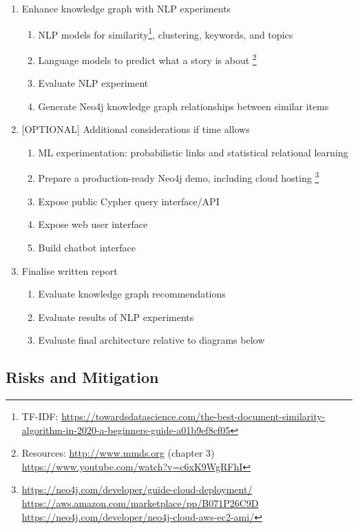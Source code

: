 \documentclass[11pt]{article}
\begin{document}
\begin{enumerate}
\item{Enhance knowledge graph with NLP experiments} \label{sec:PropNLP}
  \begin{enumerate}
  \item NLP models for similarity\footnote{TF-IDF: \url{https://towardsdatascience.com/the-best-document-similarity-algorithm-in-2020-a-beginners-guide-a01b9ef8cf05}}, clustering, keywords, and topics
  \item Language models to predict what a story is about
  \footnote{Resources: \url{http://www.mmds.org} (chapter 3) \\ \url{https://www.youtube.com/watch?v=c6xK9WgRFhI}}
  \item Evaluate NLP experiment
  \item Generate Neo4j knowledge graph relationships between similar items
  \end{enumerate}
\item{[OPTIONAL] Additional considerations if time allows} \label{sec:PropOptional}
  \begin{enumerate}
  \item ML experimentation: probabilistic links and statistical relational learning\cite{nickel2015review}
  \item Prepare a production-ready Neo4j demo, including cloud hosting
  \footnote{\url{https://neo4j.com/developer/guide-cloud-deployment/} \\ \url{https://aws.amazon.com/marketplace/pp/B071P26C9D} \\ \url{https://neo4j.com/developer/neo4j-cloud-aws-ec2-ami/} }
  \item Expose public Cypher query interface/API
  \item Expose web user interface
  \item Build chatbot interface
  \end{enumerate}
\item Finalise written report \label{sec:PropWrittenReport}
  \begin{enumerate}
  \item Evaluate knowledge graph recommendations
  \item Evaluate results of NLP experiments
  \item Evaluate final architecture relative to diagrams below
  \end{enumerate}
\end{enumerate}


\subsection{Risks and Mitigation}
\label{sec:RisksMitigation}
\end{document}
